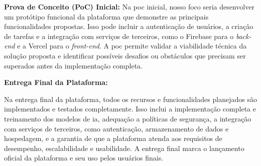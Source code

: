\textbf{Prova de Conceito (PoC) Inicial:}
Na \acs{poc} inicial, nosso foco seria desenvolver um protótipo funcional da plataforma que demonstre as principais funcionalidades propostas. Isso pode incluir a autenticação de usuários, a criação de tarefas e a integração com serviços de terceiros, como o Firebase para o \textit{back-end} e a Vercel para o \textit{front-end}. A \acs{poc} permite validar a viabilidade técnica da solução proposta e identificar possíveis desafios ou obstáculos que precisam ser superados antes da implementação completa.

\textbf{Entrega Final da Plataforma:}

Na entrega final da plataforma, todos os recursos e funcionalidades planejados são implementados e testados completamente. Isso inclui a implementação completa e treinamento dos modelos de \acs{ia}, adequação a políticas de segurança, a integração com serviços de terceiros, como autenticação, armazenamento de dados e hospedagem, e a garantia de que a plataforma atenda aos requisitos de desempenho, escalabilidade e usabilidade. A entrega final marca o lançamento oficial da plataforma e seu uso pelos usuários finais.